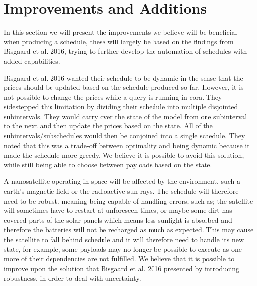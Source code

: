 \section{Improvements and Additions}
In this section we will present the improvements we believe will be beneficial when producing a schedule, these will largely be based on the findings from Bisgaard et al. 2016\cite{gomx3}, trying to further develop the automation of schedules with added capabilities.

Bisgaard et al. 2016\cite{gomx3} wanted their schedule to be dynamic in the sense that the prices should be updated based on the schedule produced so far.
However, it is not possible to change the prices while a query is running in \gls{cora}.
They sidestepped this limitation by dividing their schedule into multiple disjointed subintervals. 
They would carry over the state of the model from one subinterval to the next and then update the prices based on the state.
All of the subintervals/subschedules would then be conjoined into a single schedule.
They noted that this was a trade-off between optimality and being dynamic because it made the schedule more greedy.
We believe it is possible to avoid this solution, while still being able to choose between payloads based on the state.

A nanosatellite operating in space will be affected by the environment, such a earth's magnetic field or the radioactive sun rays.
The schedule will therefore need to be robust, meaning being capable of handling errors, such as; the satellite will sometimes have to restart at unforeseen times, or maybe some dirt has covered parts of the solar panels which means less sunlight is absorbed and therefore the batteries will not be recharged as much as expected.
This may cause the satellite to fall behind schedule and it will therefore need to handle its new state, for example, some payloads may no longer be possible to execute as one more of their dependencies are not fulfilled. 
We believe that it is possible to improve upon the solution that Bisgaard et al. 2016\cite{gomx3} presented by introducing robustness, in order to deal with uncertainty.

